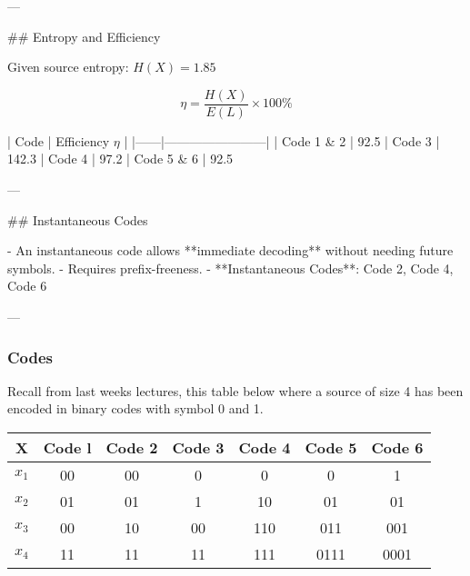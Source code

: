 ---

## Entropy and Efficiency

Given source entropy: \( H(X) = 1.85 \)

\[
\eta = \frac{H(X)}{E(L)} \times 100\%
\]

| Code | Efficiency \( \eta \) |
|------|------------------------|
| Code 1 & 2 | 92.5%
| Code 3 | 142.3%
| Code 4 | 97.2%
| Code 5 & 6 | 92.5%

---

## Instantaneous Codes

- An instantaneous code allows **immediate decoding** without needing future symbols.
- Requires prefix-freeness.
- **Instantaneous Codes**: Code 2, Code 4, Code 6

---

\begin{frame}
\frametitle{Codes}
Recall from last weeks lectures, this table below where a source of
size 4 has been encoded in binary codes with symbol 0 and 1.\\ \bigskip
\begin{center}
\begin{tabular}{|c| c| c| c| c| c| c|}
\hline
X& Code l& Code 2& Code 3 &Code 4& Code 5& Code 6\\\hline
$x_1$& 00& 00 &0 &0 &0 &1\\
$x_2$& 01& 01 &1 &10 &01 &01\\
$x_3$ &00 &10& 00& 110& 011 &001\\
$x_4$ &11& 11& 11& 111 &0111 &0001\\\hline
\end{tabular}
\end{center}
\end{frame}

